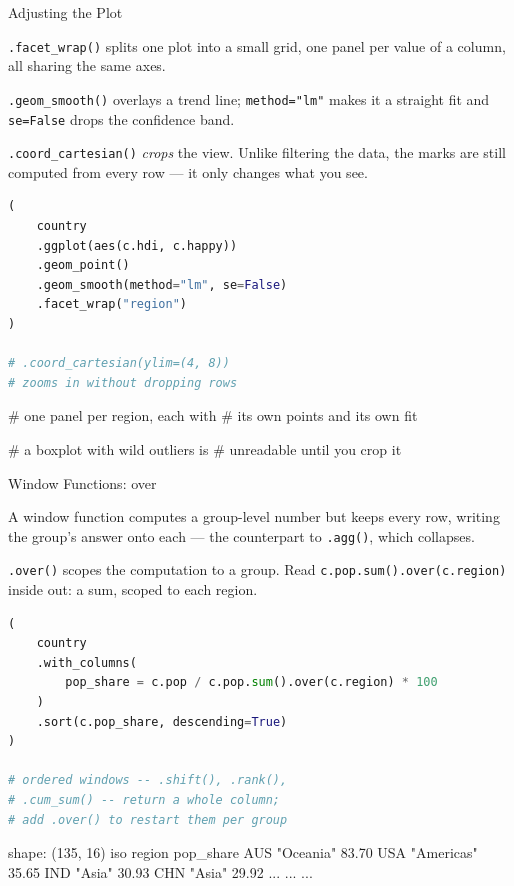 \documentclass[8pt,aspectratio=169]{beamer}
\begin{document}
\begin{frame}[fragile]{Adjusting the Plot}
\begin{splitcode}{%

\texttt{.facet\_wrap()} splits one plot into a small grid, one panel per value of a column, all sharing the same axes.

\texttt{.geom\_smooth()} overlays a trend line; \texttt{method="lm"} makes it a straight fit and \texttt{se=False} drops the confidence band.

\texttt{.coord\_cartesian()} \textit{crops} the view. Unlike filtering the data, the marks are still computed from every row --- it only changes what you see.

}
\begin{lstlisting}[language=Python]
(
    country
    .ggplot(aes(c.hdi, c.happy))
    .geom_point()
    .geom_smooth(method="lm", se=False)
    .facet_wrap("region")
)

# .coord_cartesian(ylim=(4, 8))
# zooms in without dropping rows
\end{lstlisting}
\begin{codeoutput}
# one panel per region, each with
# its own points and its own fit

# a boxplot with wild outliers is
# unreadable until you crop it
\end{codeoutput}
\end{splitcode}
\end{frame}

\begin{frame}[fragile]{Window Functions: over}
\begin{splitcode}{%

A window function computes a group-level number but keeps every row, writing the group's answer onto each --- the counterpart to \texttt{.agg()}, which collapses.

\texttt{.over()} scopes the computation to a group. Read \texttt{c.pop.sum().over(c.region)} inside out: a sum, scoped to each region.

}
\begin{lstlisting}[language=Python]
(
    country
    .with_columns(
        pop_share = c.pop / c.pop.sum().over(c.region) * 100
    )
    .sort(c.pop_share, descending=True)
)

# ordered windows -- .shift(), .rank(),
# .cum_sum() -- return a whole column;
# add .over() to restart them per group
\end{lstlisting}
\begin{codeoutput}
shape: (135, 16)
iso  region      pop_share
AUS  "Oceania"   83.70
USA  "Americas"  35.65
IND  "Asia"      30.93
CHN  "Asia"      29.92
...  ...         ...
\end{codeoutput}
\end{splitcode}
\end{frame}
\end{document}
